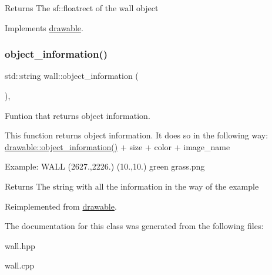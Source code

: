 \begin{DoxyReturn}{Returns}
The sf\+::floatrect of the wall object 
\end{DoxyReturn}


Implements \hyperlink{classdrawable_ae013ac0be47538be9ce885d6642daf73}{drawable}.

\mbox{\label{classwall_aab1de4f144f176b134a967ba08747932}} 
\subsubsection{\texorpdfstring{object\+\_\+information()}{object\_information()}}
{\footnotesize\ttfamily std\+::string wall\+::object\+\_\+information (\begin{DoxyParamCaption}{ }\end{DoxyParamCaption})\hspace{0.3cm}{\ttfamily [override]}, {\ttfamily [virtual]}}



Funtion that returns object information. 

This function returns object information. It does so in the following way\+: \hyperlink{classdrawable_a2ed0f8bb53f33477f7722efa7bb24583}{drawable\+::object\+\_\+information()} + size + color + image\+\_\+name

Example\+: W\+A\+LL (2627.,2226.) (10.,10.) green grass.\+png

\begin{DoxyReturn}{Returns}
The string with all the information in the way of the example 
\end{DoxyReturn}


Reimplemented from \hyperlink{classdrawable_a2ed0f8bb53f33477f7722efa7bb24583}{drawable}.



The documentation for this class was generated from the following files\+:\begin{DoxyCompactItemize}
\item 
wall.\+hpp\item 
wall.\+cpp\end{DoxyCompactItemize}
